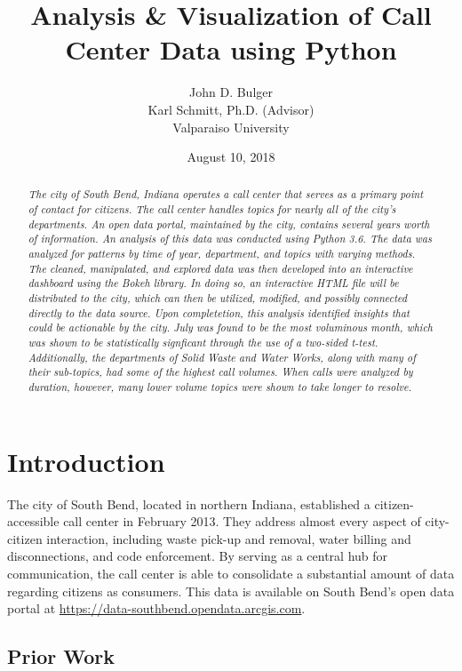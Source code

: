 \documentclass{article}
\title{Analysis \& Visualization of Call Center Data using Python}
\author{John D. Bulger
\\
Karl Schmitt, Ph.D. (Advisor)
\\
Valparaiso University\\
}
\date{August 10, 2018}
\begin{document}
\maketitle

\begin{abstract}
\textit{The city of South Bend, Indiana operates a call center that serves as a primary point of contact for citizens.  The call center handles topics for nearly all of the city's departments.  An open data portal, maintained by the city, contains several years worth of information.  An analysis of this data was conducted using Python 3.6.  The data was 
analyzed for patterns by time of year, department, and topics with varying methods.  The cleaned, manipulated, and explored data was then developed into an 
interactive dashboard using the Bokeh library.  In doing so, an interactive HTML file will be distributed to the city, which can then be utilized, modified, and possibly connected 
directly to the data source.  Upon completetion, this analysis identified insights that could be actionable by the city.  July was found to be the most voluminous month, which was shown to be statistically signficant through the use of a two-sided t-test.  Additionally, the departments of Solid Waste and Water Works, along with many of their sub-topics, had some of the highest call volumes.  When calls were analyzed by duration, however, many lower volume topics were shown to take longer to resolve.}
\end{abstract}

\section{Introduction}
The city of South Bend, located in northern Indiana, established a citizen-accessible call center in February 2013.  They address almost every aspect of city-citizen interaction, including waste pick-up and removal, water billing and disconnections, 
and code enforcement.  By serving as a central hub for communication, the call center is able to consolidate a substantial amount of data regarding citizens as consumers.  This data is available on South Bend's open data portal at \href{https://data-southbend.opendata.arcgis.com}{https://data-southbend.opendata.arcgis.com}.

	\subsection{Prior Work}
\end{document}

